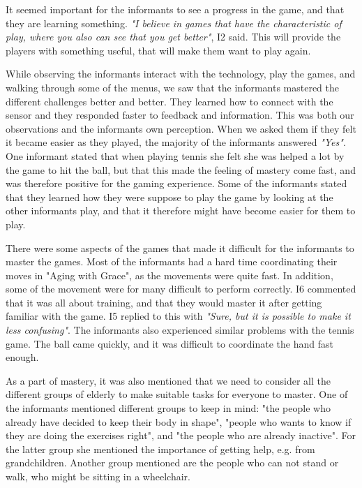 It seemed important for the informants to see a progress in the game, and that they are learning something. \emph{"I believe in games that have the characteristic of play, where you also can see that you get better"}, I2 said. This will provide the players with something useful, that will make them want to play again.

While observing the informants interact with the technology, play the games, and walking through some of the menus, we saw that the informants mastered the different challenges better and better. They learned how to connect with the sensor and they responded faster to feedback and information. This was both our observations and the informants own perception. When we asked them if they felt it became easier as they played, the majority of the informants answered \emph{"Yes"}. One informant stated that when playing tennis she felt she was helped a lot by the game to hit the ball, but that this made the feeling of mastery come fast, and was therefore positive for the gaming experience. Some of the informants stated that they learned how they were suppose to play the game by looking at the other informants play, and that it therefore might have become easier for them to play. 

There were some aspects of the games that made it difficult for the informants to master the games. Most of the informants had a hard time coordinating their moves in "Aging with Grace", as the movements were quite fast. In addition, some of the movement were for many difficult to perform correctly. I6 commented that it was all about training, and that they would master it after getting familiar with the game. I5 replied to this with \emph{"Sure, but it is possible to make it less confusing"}. The informants also experienced similar problems with the tennis game. The ball came quickly, and it was difficult to coordinate the hand fast enough. 

As a part of mastery, it was also mentioned that we need to consider all the different groups of elderly to make suitable tasks for everyone to master. One of the informants mentioned different groups to keep in mind: "the people who already have decided to keep their body in shape", "people who wants to know if they are doing the exercises right", and "the people who are already inactive". For the latter group she mentioned the importance of getting help, e.g. from grandchildren.  Another group mentioned are the people who can not stand or walk, who might be sitting in a wheelchair.

